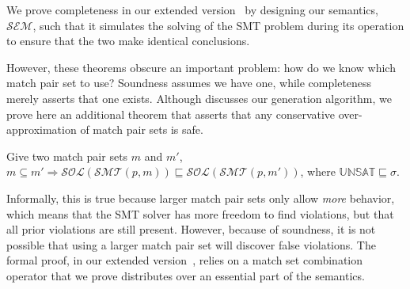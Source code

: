 We prove completeness in our extended version~\cite{extended-version}
by designing our semantics, $\mathcal{SEM}$, such that it simulates
the solving of the SMT problem during its operation to ensure that the
two make identical conclusions.

However, these theorems obscure an important problem: how do we know
which match pair set to use? Soundness assumes we have one, while
completeness merely asserts that one exists. Although 
discusses our generation algorithm, we prove here an additional
theorem that asserts that any conservative over-approximation of match
pair sets is safe.

\begin{theorem}[Approximation]
Give two match pair sets $m$ and $m'$, $m \subseteq m' \Rightarrow \mathcal{SOL}(\mathcal{SMT}(p, m))
  \sqsubseteq \mathcal{SOL}(\mathcal{SMT}(p, m'))$, where
  $\mathbb{UNSAT} \sqsubseteq \sigma$.
\end{theorem}

Informally, this is true because larger match pair sets only allow
\emph{more} behavior, which means that the SMT solver has more freedom
to find violations, but that all prior violations are still
present. However, because of soundness, it is not possible that using
a larger match pair set will discover false violations. The formal
proof, in our extended version~\cite{extended-version}, relies on a
match set combination operator that we prove distributes over an
essential part of the semantics.
